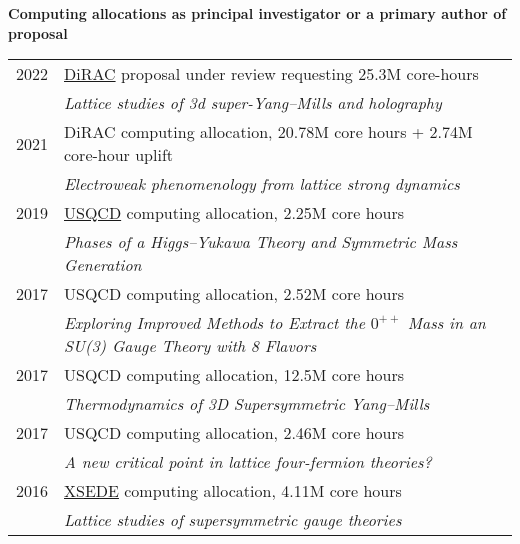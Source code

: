 \begin{spacelist}
  \vspace{18 pt}
  \item {\large \bfseries Computing allocations as principal investigator or a primary author of proposal} \\[10 pt]
    \begin{tabular}[t]{cl}
      2022 & \href{https://dirac.ac.uk}{DiRAC} proposal under review requesting 25.3M core-hours                      \\ %
           & \textit{Lattice studies of 3d super-Yang--Mills and holography}                                          \\[6 pt]
      2021 & DiRAC computing allocation, 20.78M core hours + 2.74M core-hour uplift                                   \\ %
           & \textit{Electroweak phenomenology from lattice strong dynamics}                                          \\[6 pt]
      2019 & \href{http://www.usqcd.org}{USQCD} computing allocation, 2.25M core hours                                \\ %
           & \textit{Phases of a Higgs--Yukawa Theory and Symmetric Mass Generation}                                  \\[6 pt]
      2017 & USQCD computing allocation, 2.52M core hours                                                             \\ %
           & \textit{Exploring Improved Methods to Extract the $0^{++}$ Mass in an SU(3) Gauge Theory with 8 Flavors} \\[6 pt]
      2017 & USQCD computing allocation, 12.5M core hours                                                             \\ %
           & \textit{Thermodynamics of 3D Supersymmetric Yang--Mills}                                                 \\[6 pt]
      2017 & USQCD computing allocation, 2.46M core hours                                                             \\ %
           & \textit{A new critical point in lattice four-fermion theories?}                                          \\[6 pt]
      2016 & \href{http://www.xsede.org}{XSEDE} computing allocation, 4.11M core hours                                \\ %
           & \textit{Lattice studies of supersymmetric gauge theories}                                                \\[6 pt]

\end{tabular}
\end{spacelist}
